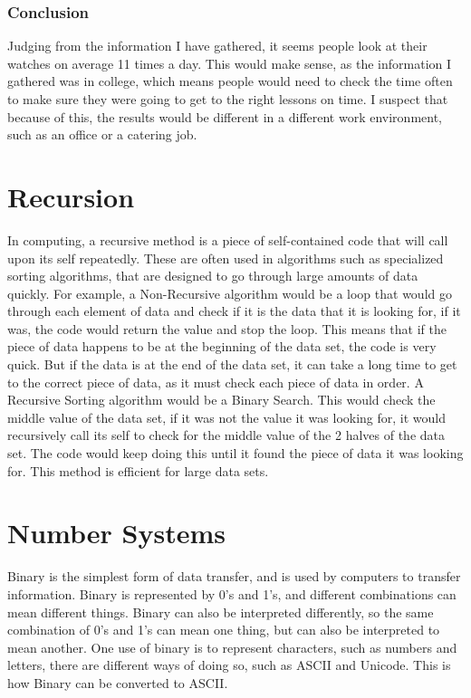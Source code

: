 \documentclass[a4paper,12pt]{article}
\begin{document}
  \subsubsection{Conclusion}
    Judging from the information I have gathered, it seems people look at their watches on average 11 times a day. This would make sense, as the information I gathered was in college, which means people would need to check the time often to make sure they were going to get to the right lessons on time. I suspect that because of this, the results would be different in a different work environment, such as an office or a catering job.

\newpage

\section{Recursion}
  In computing, a recursive method is a piece of self-contained code that will call upon its self repeatedly. These are often used in algorithms such as specialized sorting algorithms, that are designed to go through large amounts of data quickly. For example, a Non-Recursive algorithm would be a loop that would go through each element of data and check if it is the data that it is looking for, if it was, the code would return the value and stop the loop. This means that if the piece of data happens to be at the beginning of the data set, the code is very quick. But if the data is at the end of the data set, it can take a long time to get to the correct piece of data, as it must check each piece of data in order.
  A Recursive Sorting algorithm would be a Binary Search. This would check the middle value of the data set, if it was not the value it was looking for, it would recursively call its self to check for the middle value of the 2 halves of the data set. The code would keep doing this until it found the piece of data it was looking for. This method is efficient for large data sets.

\section{Number Systems}
  Binary is the simplest form of data transfer, and is used by computers to transfer information. Binary is represented by 0’s and 1’s, and different combinations can mean different things. Binary can also be interpreted differently, so the same combination of 0’s and 1’s can mean one thing, but can also be interpreted to mean another. One use of binary is to represent characters, such as numbers and letters, there are different ways of doing so, such as ASCII and Unicode. This is how Binary can be converted to ASCII.
\end{document}
